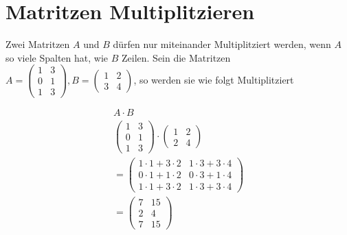 \chapter{Matritzen Multiplitzieren}
\label{matrix_multiplitzieren}

Zwei Matritzen $A$ und $B$ dürfen nur miteinander Multiplitziert werden, wenn
$A$ so viele Spalten hat, wie $B$ Zeilen. Sein die Matritzen $A = \begin{pmatrix}
        1 & 3 \\
        0 & 1 \\
        1 & 3
    \end{pmatrix}, B = \begin{pmatrix}
        1 & 2 \\
        3 & 4
    \end{pmatrix}$, so werden sie wie folgt Multiplitziert

\begin{align*}
    A \cdot B                                       \\
    \begin{pmatrix}
        1 & 3 \\
        0 & 1 \\
        1 & 3
    \end{pmatrix} \cdot \begin{pmatrix}
                            1 & 2 \\
                            2 & 4
                        \end{pmatrix}              \\
    = \begin{pmatrix}
          1 \cdot 1 + 3 \cdot 2 & 1 \cdot 3 + 3 \cdot 4 \\
          0 \cdot 1 + 1 \cdot 2 & 0 \cdot 3 + 1 \cdot 4 \\
          1 \cdot 1 + 3 \cdot 2 & 1 \cdot 3 + 3 \cdot 4
      \end{pmatrix} \\
    = \begin{pmatrix}
          7 & 15 \\
          2 & 4  \\
          7 & 15
      \end{pmatrix}
\end{align*}